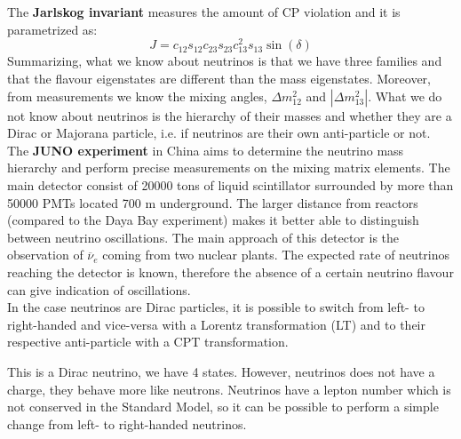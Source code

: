 \documentclass[10.75pt,a4paper,openright,bottom=2cm]{article}
\begin{document}
The \textbf{Jarlskog invariant} measures the amount of CP violation and it is parametrized as:
\[
J=c_{12}s_{12}c_{23}s_{23}c_{13}^2s_{13}\sin(\delta)
\]
Summarizing, what we know about neutrinos is that we have three families and that the flavour eigenstates are different than the mass eigenstates. Moreover, from measurements we know the mixing angles, $\Delta m^2_{12}$ and $|\Delta m^2_{13}|$. What we do not know about neutrinos is the hierarchy of their masses and whether they are a Dirac or Majorana particle, i.e. if neutrinos are their own anti-particle or not.\\
The \textbf{JUNO experiment} in China aims to determine the neutrino mass hierarchy and perform precise measurements on the mixing matrix elements. The main detector consist of 20000 tons of liquid scintillator surrounded by more than 50000 PMTs located 700 m underground. The larger distance from reactors (compared to the Daya Bay experiment) makes it better able to distinguish between neutrino oscillations. The main approach of this detector is the observation of $\overline{\nu}_e$ coming from two nuclear plants. The expected rate of neutrinos reaching the detector is known, therefore the absence of a certain neutrino flavour can give indication of oscillations.\\
In the case neutrinos are Dirac particles, it is possible to switch from left- to right-handed and vice-versa with a Lorentz transformation (LT) and to their respective anti-particle with a CPT transformation.
\begin{center}
\end{center}
This is a Dirac neutrino, we have 4 states. However, neutrinos does not have a charge, they behave more like neutrons. Neutrinos have a lepton number which is not conserved in the Standard Model, so it can be possible to perform a simple change from left- to right-handed neutrinos.\\
\end{document}
